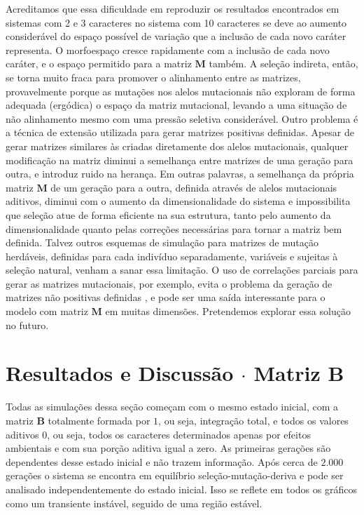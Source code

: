 Acreditamos que essa dificuldade em reproduzir os resultados encontrados
em sistemas com 2 e 3 caracteres no sistema com 10 caracteres se deve ao aumento
considerável do espaço possível de variação que a inclusão de cada novo
caráter representa.
O morfoespaço cresce rapidamente com a inclusão de cada novo caráter, e
o espaço permitido para a matriz $\mathbf{M}$ também.
A seleção indireta, então, se torna muito fraca para promover o
alinhamento entre as matrizes, provavelmente porque as mutações nos
alelos mutacionais não exploram de forma adequada (ergódica) o espaço da
matriz mutacional, levando a uma situação de não alinhamento mesmo com
uma pressão seletiva considerável.
Outro problema é a técnica de extensão utilizada para gerar matrizes
positivas definidas.
Apesar de gerar matrizes similares às criadas diretamente dos alelos
mutacionais, qualquer modificação na matriz diminui a semelhança entre
matrizes de uma geração para outra, e introduz ruido na herança.
Em outras palavras, a semelhança da própria matriz $\mathbf{M}$ de um
geração para a outra, definida através de alelos mutacionais aditivos,
diminui com o aumento da dimensionalidade do sistema e impossibilita que
seleção atue de forma eficiente na sua estrutura, tanto pelo aumento da
dimensionalidade quanto pelas correções necessárias para tornar a matriz
bem definida.
Talvez outros esquemas de simulação para matrizes de mutação herdáveis,
definidas para cada indivíduo separadamente, variáveis e sujeitas à
seleção natural, venham a sanar essa limitação.
O uso de correlações parciais para gerar as matrizes mutacionais, por
exemplo, evita o problema da geração de matrizes não positivas
definidas \citep{Joe2006, Lewandowski2009}, e pode ser uma saída
interessante para o modelo com matriz $\mathbf{M}$ em muitas dimensões.
Pretendemos explorar essa solução no futuro.

\section{Resultados e Discussão $\cdot$ Matriz $\mathbf{B}$}

Todas as simulações dessa seção começam com o mesmo estado inicial, com
a matriz $\mathbf{B}$ totalmente formada por $1$, ou seja, integração total, e
todos os valores aditivos $0$, ou seja, todos os caracteres determinados
apenas por efeitos ambientais e com sua porção aditiva igual a zero.
As primeiras gerações são dependentes desse estado inicial e não trazem
informação.
Após cerca de $2.000$ gerações o sistema se encontra em equilíbrio
seleção-mutação-deriva e pode ser analisado independentemente do estado
inicial.
Isso se reflete em todos os gráficos como um transiente instável, seguido
de uma região estável.

